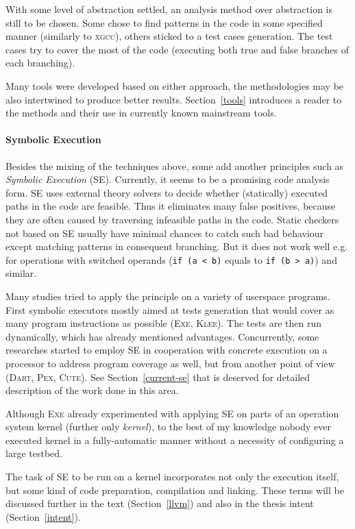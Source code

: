 \documentclass[11pt,a4paper]{article}
\begin{document}
With some level of abstraction settled, an analysis method over abstraction is
still to be chosen. Some chose to find patterns in the code in some specified
manner (similarly to \textsc{xgcc}), others sticked to a test cases
generation. The test cases try to cover the most of the code (executing both
true and false branches of each branching).

Many tools were developed based on either approach, the methodologies may be
also intertwined to produce better results. Section~\ref{tools} introduces a
reader to the methods and their use in currently known mainstream tools.

\paragraph{Symbolic Execution} Besides the mixing of the techniques above,
some add another principles such as \emph{Symbolic Execution} (SE). Currently,
it seems to be a promising code analysis form. SE uses external theory
solvers to decide whether (statically) executed paths in the code are
feasible. Thus it eliminates many false positives, because they are often
caused by traversing infeasible paths in the code. Static checkers not based
on SE usually have minimal chances to catch such bad behaviour except matching
patterns in consequent branching. But it does not work well e.g. for
operations with switched operands (\texttt{if (a < b)} equals to \texttt{if (b
> a)}) and similar.

Many studies tried to apply the principle on a variety of userspace programs.
First symbolic executors mostly aimed at tests generation that would cover
as many program instructions as possible (\textsc{Exe}, \textsc{Klee}). The
tests are then run dynamically, which has already mentioned advantages.
Concurrently, some researches started to employ SE in cooperation with
concrete execution on a processor to address program coverage as well, but
from another point of view (\textsc{Dart}, \textsc{Pex}, \textsc{Cute}).
See Section~\ref{current-se} that is deserved for detailed description of
the work done in this area.

Although \textsc{Exe} already experimented with applying SE on parts of an
operation system kernel (further only \emph{kernel}), to the best of my
knowledge nobody ever executed kernel in a fully-automatic manner without a
necessity of configuring a large testbed.

The task of SE to be run on a kernel incorporates not only the execution
itself, but some kind of code preparation, compilation and linking. These
terms will be discussed further in the text (Section~\ref{llvm}) and also in
the thesis intent (Section~\ref{intent}).
\end{document}
